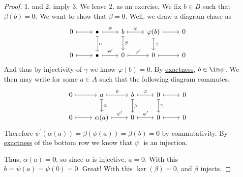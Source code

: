 \begin{proof}
	1. and 2. imply 3. We leave 2. as an exercise. We fix \(b \in B\) such that \(\beta(b) = 0\). We want to show that \(\beta = 0\). Well, we draw a diagram chase as
	\[
		\begin{tikzcd}
			0 & {\bullet } & b & {\varphi(b)} & 0 \\
			0 & {\bullet } & 0 & 0 & 0
			\arrow[maps to, from=1-1, to=1-2]
			\arrow["\psi", maps to, from=1-2, to=1-3]
			\arrow["\varphi", maps to, from=1-3, to=1-4]
			\arrow[maps to, from=1-4, to=1-5]
			\arrow["\gamma", maps to, from=1-4, to=2-4]
			\arrow[maps to, from=2-4, to=2-5]
			\arrow["{\varphi^\prime}", maps to, from=2-3, to=2-4]
			\arrow["\beta", maps to, from=1-3, to=2-3]
			\arrow["{\psi^\prime}", maps to, from=2-2, to=2-3]
			\arrow["\alpha", maps to, from=1-2, to=2-2]
			\arrow[maps to, from=2-1, to=2-2]
		\end{tikzcd}
	\]
	And thus by injectivity of \(\gamma\) we know \(\varphi(b) = 0\). By \hyperref[def:exact]{exactness}, \(b \in \im \psi\). We then
	may write for some \(a \in A\) such that the following diagram commutes.
	\[
		\begin{tikzcd}
			0 & a & b & 0 & 0 \\
			0 & {\alpha(a)} & 0 & 0 & 0
			\arrow[maps to, from=1-1, to=1-2]
			\arrow["\varphi", maps to, from=1-3, to=1-4]
			\arrow[maps to, from=1-4, to=1-5]
			\arrow["\gamma", maps to, from=1-4, to=2-4]
			\arrow[maps to, from=2-4, to=2-5]
			\arrow["{\varphi^\prime}", maps to, from=2-3, to=2-4]
			\arrow["\beta", maps to, from=1-3, to=2-3]
			\arrow["{\psi^\prime}", maps to, from=2-2, to=2-3]
			\arrow["\alpha", maps to, from=1-2, to=2-2]
			\arrow[maps to, from=2-1, to=2-2]
			\arrow["\psi", maps to, from=1-2, to=1-3]
		\end{tikzcd}
	\]
	Therefore \(\psi^\prime (\alpha(a)) = \beta(\psi(a)) = \beta(b) = 0\) by commutativity. By \hyperref[def:exact-sequence]{exactness} of the
	bottom row we know that \(\psi^\prime\) is an injection.

	Thus, \(\alpha(a) = 0\), so since \(\alpha\) is injective, \(a = 0\). With this \(b = \psi(a) = \psi(0) = 0\). Great! With this
	\(\ker(\beta) = 0\), and \(\beta\) injects.
\end{proof}

